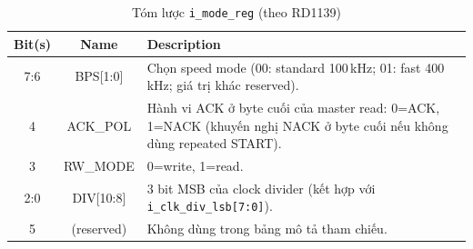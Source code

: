 \begin{table}[H]
    \centering
    \caption{Tóm lược \texttt{i\_mode\_reg} (theo RD1139)}
    \label{tab:mode_reg_bits}
    \begin{tabularx}{\textwidth}{|c|c|X|}
        \hline
        \textbf{Bit(s)} & \textbf{Name} & \textbf{Description} \\
        \hline
        7:6 & BPS[1:0] & Chọn speed mode (00: standard 100\,kHz; 01: fast 400\,kHz; giá trị khác reserved). \\
        \hline
        4 & ACK\_POL & Hành vi ACK ở byte cuối của master read: 0=ACK, 1=NACK (khuyến nghị NACK ở byte cuối nếu không dùng repeated START). \\
        \hline
        3 & RW\_MODE & 0=write, 1=read. \\
        \hline
        2:0 & DIV[10:8] & 3 bit MSB của clock divider (kết hợp với \texttt{i\_clk\_div\_lsb[7:0]}). \\
        \hline
        5 & (reserved) & Không dùng trong bảng mô tả tham chiếu. \\
        \hline
    \end{tabularx}
\end{table}

